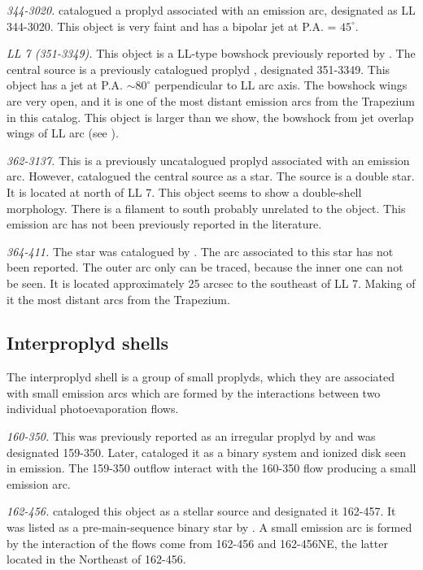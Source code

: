 \documentclass[apj, twocolumn]{aastex63}
\renewcommand\clearpage{}
\begin{document}
\textit{344-3020.} \citet{Bally:2006a} catalogued a proplyd associated
with an emission arc, designated as LL 344-3020. This object is very faint
and has a bipolar jet at P.A. = $45^{\circ}$.     

\textit{LL 7 (351-3349).} This object is a LL-type bowshock previously
reported by \citet{Bally:2001a}. The central source is a previously
catalogued proplyd \citep{Ricci:2008a}, designated 351-3349. This object
has a jet at P.A. $\sim 80^{\circ}$ perpendicular to LL arc axis. The
bowshock wings are very open, and it is one of the most distant emission
arcs from the Trapezium in this catalog. This object is larger than we show,
the bowshock from jet overlap wings of LL arc (see \citealp{Bally:2001a}).   

\textit{362-3137.} This is a previously uncatalogued proplyd associated
with an emission arc. However, \citet{Da-Rio:2009a} catalogued the
central source as a star. The source is a double star. It is located at
north of LL 7. This object seems to show a double-shell morphology.
There is a filament to south probably unrelated to the object. This
emission arc has not been previously reported in the literature.

\textit{364-411.} The star was catalogued by \citet{Hillenbrand:1997}.
The arc associated to this star has not been reported. The outer
arc only can be traced, because the inner one can not be seen.
It is located approximately 25 arcsec to the southeast of LL 7.
Making of it the most distant arcs from the Trapezium.

\clearpage
\subsection{Interproplyd shells}
\label{sec:interproplyd-group}



The interproplyd shell is a  group of small proplyds, which they are
associated with small emission arcs which are formed by the interactions
between two individual photoevaporation flows.
    
\textit{160-350.} This was previously reported as an irregular proplyd
by \citet{ODell:1994a} and was designated 159-350. Later, \citet{Ricci:2008a}
cataloged it as a binary system and ionized disk seen in emission.
The 159-350 outflow interact with the 160-350 flow producing a small
emission arc.  

\textit{162-456.} \citet{ODell:1996a} cataloged this object as a stellar
source and designated it 162-457. It was listed as a pre-main-sequence
binary star by \citet{Reipurth:2007a}. A small emission arc is formed by
the interaction of the flows come from 162-456 and 162-456NE, the latter
located in the Northeast of 162-456.     
\end{document}
